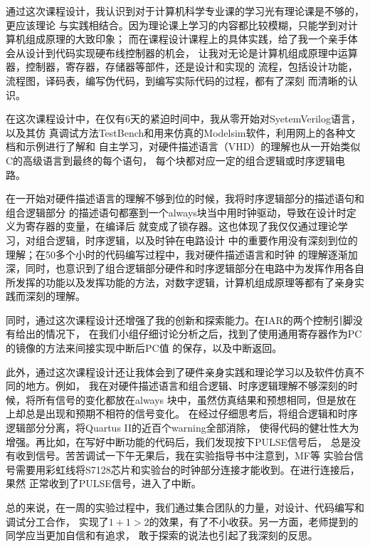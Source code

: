通过这次课程设计，我认识到对于计算机科学专业课的学习光有理论课是不够的，更应该理论
与实践相结合。因为理论课上学习的内容都比较模糊，只能学到对计算机组成原理的大致印象；
而在课程设计课程上的具体实践，给了我一个亲手体会从设计到代码实现硬布线控制器的机会，
让我对无论是计算机组成原理中运算器，控制器，寄存器，存储器等部件，还是设计和实现的
流程，包括设计功能，流程图，译码表，编写伪代码，到编写实际代码的过程，都有了深刻
而清晰的认识。
\par
在这次课程设计中，在仅有6天的紧迫时间中，我从零开始对SyetemVerilog语言，以及其仿
真调试方法TestBench和用来仿真的Modelsim软件，利用网上的各种文档和示例进行了解和
自主学习，对硬件描述语言（VHD）的理解也从一开始类似C的高级语言到最终的每个语句，
每个块都对应一定的组合逻辑或时序逻辑电路。
\par
在一开始对硬件描述语言的理解不够到位的时候，我将时序逻辑部分的描述语句和组合逻辑部分
的描述语句都塞到一个always块当中用时钟驱动，导致在设计时定义为寄存器的变量，在编译后
就变成了锁存器。这也体现了我仅仅通过理论学习，对组合逻辑，时序逻辑，以及时钟在电路设计
中的重要作用没有深刻到位的理解；在50多个小时的代码编写过程中，我对硬件描述语言和时钟
的理解逐渐加深，同时，也意识到了组合逻辑部分硬件和时序逻辑部分在电路中为发挥作用各自
所发挥的功能以及发挥功能的方法，对数字逻辑，计算机组成原理等都有了亲身实践而深刻的理解。
\par
同时，通过这次课程设计还增强了我的创新和探索能力。在IAR的两个控制引脚没有给出的情况下，
在我们小组仔细讨论分析之后，找到了使用通用寄存器作为PC的镜像的方法来间接实现中断后PC值
的保存，以及中断返回。
\par
此外，通过这次课程设计还让我体会到了硬件亲身实践和理论学习以及软件仿真不同的地方。例如，
我在对硬件描述语言和组合逻辑、时序逻辑理解不够深刻的时候，将所有信号的变化都放在always
块中，虽然仿真结果和预想相同，但是放在\tec 上却总是出现和预期不相符的信号变化。
在经过仔细思考后，将组合逻辑和时序逻辑部分分离，将Quartus II的近百个warning全部消除，
使得代码的健壮性大为增强。再比如，在写好中断功能的代码后，我们发现按下PULSE信号后，
\tec 总是没有收到信号。苦苦调试一下午无果后，我在\tec 实验指导书中注意到，MF等
实验台信号需要用彩虹线将S7128芯片和实验台的时钟部分连接才能收到。在进行连接后，果然
正常收到了PULSE信号，进入了中断。
\par
总的来说，在一周的实验过程中，我们通过集合团队的力量，对设计、代码编写和调试分工合作，
实现了$1+1 > 2$的效果，有了不小收获。另一方面，老师提到的同学应当更加自信和有追求，
敢于探索的说法也引起了我深刻的反思。